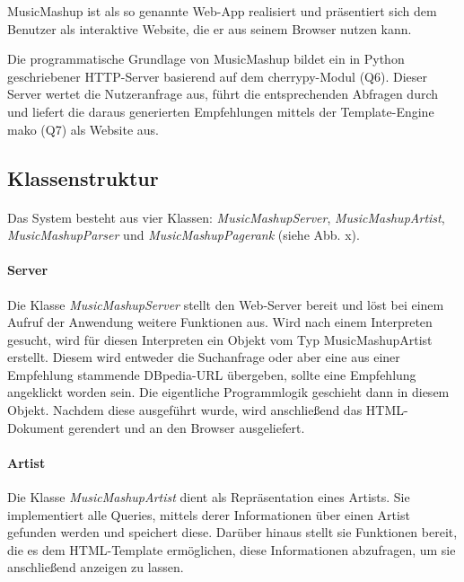 MusicMashup ist als so genannte Web-App realisiert und präsentiert sich dem Benutzer als interaktive Website, die er aus seinem Browser nutzen kann.

Die programmatische Grundlage von MusicMashup bildet ein in Python geschriebener 
HTTP-Server basierend auf dem cherrypy-Modul (Q6). Dieser Server wertet die Nutzeranfrage aus, führt die entsprechenden Abfragen durch und liefert die daraus generierten Empfehlungen mittels der Template-Engine mako (Q7) als Website aus. 

\subsection{Klassenstruktur}


\paragraph{}Das System besteht aus vier Klassen: \textit{MusicMashupServer}, \textit{MusicMashupArtist}, \textit{MusicMashupParser} und \textit{MusicMashupPagerank} (siehe Abb. x).




\paragraph{Server} Die Klasse \textit{MusicMashupServer} stellt den Web-Server bereit und löst bei einem Aufruf der Anwendung weitere Funktionen aus. Wird nach einem Interpreten gesucht, wird für diesen Interpreten ein Objekt vom Typ MusicMashupArtist erstellt. Diesem wird entweder die Suchanfrage oder aber eine aus einer Empfehlung stammende DBpedia-URL übergeben, sollte eine Empfehlung angeklickt worden sein. Die eigentliche Programmlogik geschieht dann in diesem Objekt. Nachdem diese ausgeführt wurde, wird anschließend das HTML-Dokument gerendert und an den Browser ausgeliefert.


\paragraph{Artist} Die Klasse \textit{MusicMashupArtist} dient als Repräsentation eines Artists. Sie implementiert alle Queries, mittels derer Informationen über einen Artist gefunden werden und speichert diese. Darüber hinaus stellt sie Funktionen bereit, die es dem HTML-Template ermöglichen, diese Informationen abzufragen, um sie anschließend anzeigen zu lassen.


